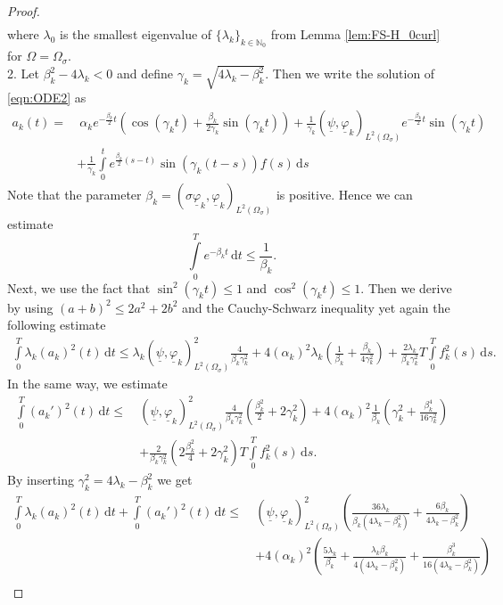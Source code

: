 \documentclass[a4paper,11pt]{article}
\newcommand{\N}{\mathbb N}
\newcommand{\intT}{\int\limits_{0}^T}
\newcommand{\omsig}{\Omega_{\sigma}}
\renewcommand{\vec}[1]{\underline{#1}}
\begin{document}
\begin{proof}
\begin{align*}
	\end{align*}
	where $\lambda_0$ is the smallest eigenvalue of $\{\lambda_k\}_{k\in \N_0}$ from Lemma \ref{lem:FS-H_0curl} for $\Omega=\omsig$. \\
	2. Let $\beta_k^2-4\lambda_k<0$ and define $\gamma_k = \sqrt{4\lambda_k-\beta_k^2}$. Then we write the solution of \eqref{eqn:ODE2} as 
	\begin{align*}
		 {a_k} (t) =&\ \alpha_k e^{-\frac{\beta_k}{2}t}\left( \cos(\gamma_kt)+\frac{\beta_k}{2\gamma_k} \sin(\gamma_kt)\right) +\frac{1}{\gamma_k}(\vec \psi,\vec \varphi_k)_{L^2(\omsig)}  e^{-\frac{\beta_k}{2}t}\sin(\gamma_kt)\\
		&+\frac{1}{\gamma_k}\int\limits_0^te^{\frac{\beta_k}{2}(s-t)}\sin(\gamma_k(t-s))f(s)\,\mathrm ds
	\end{align*}
	Note that the parameter $\beta_k = (\sigma \vec \varphi_k,\vec \varphi_k)_{L^2(\omsig)}$ is positive. Hence we can estimate 
	\[\intT e^{-\beta_k t}\,\mathrm dt\leq \frac{1}{\beta_k}. \]
	Next, we use the fact that $\sin^2(\gamma_kt)\leq 1$ and $\cos^2(\gamma_kt)\leq 1$. Then we derive by using $(a+b)^2\leq 2 a^2+2b^2$ and the Cauchy-Schwarz inequality yet again the following estimate
	\begin{align*}
		\intT \lambda_k( {a_k})^2(t)\,\mathrm dt\leq \lambda_k(\vec \psi,\vec \varphi_k)^2_{L^2(\omsig)}\frac{4 }{\beta_k\gamma_k^2}+4(\alpha_k)^2\lambda_k\left(\frac{1}{\beta_k}+\frac{\beta_k}{4\gamma_k^2}\right)+\frac{2\lambda_k}{\beta_k\gamma_k^2}T\intT f_k^2(s)\,\mathrm ds.
	\end{align*}
	In the same way, we estimate
	\begin{align*}
		\intT ( {a_k}')^2(t)\,\mathrm dt\leq\ & (\vec \psi,\vec \varphi_k)^2_{L^2(\omsig)}\frac{4 }{\beta_k\gamma_k^2} \left(\frac{\beta_k^2}{2}+2\gamma_k^2\right) + 4(\alpha_k)^2\frac{1}{\beta_k}\left(\gamma_k^2 + \frac{\beta_k^4}{16\gamma_k^2}\right)\\
		&+\frac{2}{\beta_k\gamma_k^2}\left(2\frac{\beta_k^2}{4}+ 2 \gamma_k^2\right)T\intT f_k^2(s)\,\mathrm ds.
	\end{align*}
	By inserting $\gamma_k^2 = {4\lambda_k-\beta_k^2}$ we get
	\begin{align*}
		\intT \lambda_k( {a_k})^2(t)\,\mathrm dt+\intT ( {a_k}')^2(t)\,\mathrm dt\leq\ & (\vec \psi,\vec \varphi_k)^2_{L^2(\omsig)}\left(\frac{36\lambda_k }{\beta_k(4\lambda_k-\beta_k^2)}+\frac{6\beta_k }{4\lambda_k-\beta_k^2} \right)\\
		& + 4(\alpha_k)^2\left(\frac{5\lambda_k}{\beta_k}+\frac{\lambda_k\beta_k}{4(4\lambda_k-\beta_k^2)}+ \frac{\beta_k^3}{16(4\lambda_k-\beta_k^2)}\right)\\

\end{align*}
\end{proof}
\end{document}
